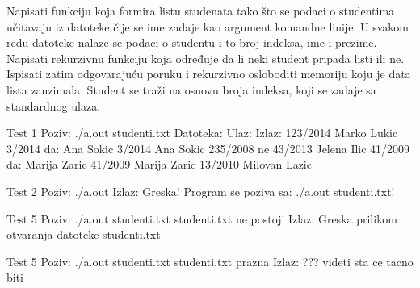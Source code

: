 \begin{Answer}[ref=609]
\end{Answer}



\begin{Exercise}[label=610]
Napisati funkciju koja formira listu studenata tako što se podaci o studentima 
učitavaju iz datoteke čije se ime zadaje kao argument komandne linije. 
U svakom redu datoteke nalaze se podaci o studentu i to broj indeksa, ime
i prezime. Napisati rekurzivnu funkciju koja određuje da li neki student pripada listi ili ne.
Ispisati zatim odgovarajuću poruku i rekurzivno osloboditi memoriju koju je data lista zauzimala.
Student se traži na osnovu broja indeksa, koji se zadaje sa standardnog ulaza.
\begin{maxitest}
    \begin{test}{Test 1}
Poziv: ./a.out studenti.txt
Datoteka:                 Ulaz:       Izlaz:
123/2014 Marko Lukic      3/2014      da: Ana Sokic
3/2014 Ana Sokic          235/2008    ne
43/2013 Jelena Ilic       41/2009     da: Marija Zaric
41/2009 Marija Zaric
13/2010 Milovan Lazic
  \end{test}
\end{maxitest}

\begin{miditest}
  \begin{test}{Test 2}
Poziv: ./a.out
Izlaz: Greska! Program se poziva sa: ./a.out studenti.txt!
  \end{test}
\end{miditest}  


\begin{miditest}
  \begin{test}{Test 5}
Poziv: ./a.out  studenti.txt
studenti.txt ne postoji
Izlaz: Greska prilikom otvaranja datoteke studenti.txt
  \end{test}
\end{miditest}
  
  
\begin{miditest}
  \begin{test}{Test 5}
Poziv: ./a.out  studenti.txt
studenti.txt prazna
Izlaz: ???  videti sta ce tacno biti 
  \end{test}
\end{miditest}

\end{Exercise}
\begin{Answer}[ref=610]
\end{Answer}

